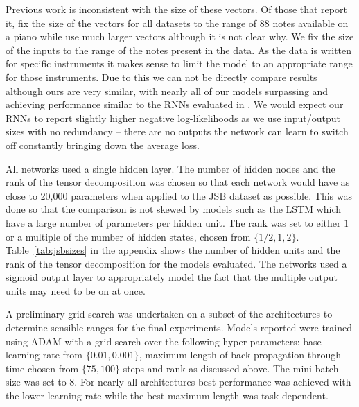 Previous work is inconsistent with the size of these vectors. Of those that
report it, \autocite{Boulanger-Lewandowski2012} fix the size of the vectors for all
datasets to the range of 88 notes available on a piano while \autocite{Chung2014}
use much larger vectors although it is not clear why. We fix the size of the
inputs to the range of the notes present in the data. As the data is
written for specific instruments it makes sense to limit the model
to an appropriate range for those instruments. Due to this we
can not be directly compare results although ours are very similar,
with nearly all of our models surpassing \autocite{Chung2014} and achieving performance
similar to the RNNs evaluated in \autocite{Boulanger-Lewandowski2012}. We would
expect our RNNs to report slightly higher negative log-likelihoods as we use input/output
sizes with no redundancy -- there are no outputs the network can learn to switch off
constantly bringing down the average loss.

All networks used a single hidden layer. The number of hidden nodes and the rank of
the tensor decomposition was chosen so that each network would have as close to
20,000 parameters when applied to the JSB dataset as possible. This was done 
so that the comparison is not skewed by models such as
the LSTM which have a large number of parameters per hidden unit. The rank was set to
either \(1\) or a multiple of the number of hidden states, chosen from \(\{1/2, 1, 2\}\).
Table~\ref{tab:jsbsizes} in the appendix shows the number of hidden units and the rank of the tensor
decomposition for the models evaluated. The networks used a sigmoid output layer to
appropriately model the fact that the multiple output units may need to be on at once.


A preliminary grid search was undertaken on a subset of the architectures to determine
sensible ranges for the final experiments. Models reported were trained using ADAM with
a grid search over the following hyper-parameters: base learning rate from \(\{0.01, 0.001\}\),
maximum length of back-propagation through time chosen from \(\{75, 100\}\) steps
and rank as discussed above. The mini-batch size was set to \(8\). For nearly all architectures 
best performance was
achieved with the lower learning rate while the best maximum length was task-dependent.

